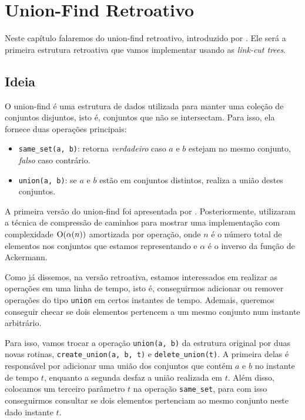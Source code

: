 
\chapter{Union-Find Retroativo}
\label{cap:union-find}

Neste capítulo falaremos do union-find retroativo, introduzido por \citet{10.1145/1240233.1240236}. Ele será a primeira estrutura retroativa que vamos implementar usando as \emph{link-cut trees}.

\section{Ideia}
\label{sec:uf-ideia}

O union-find é uma estrutura de dados utilizada para manter uma coleção de conjuntos disjuntos, isto é, conjuntos que não se intersectam. Para isso, ela fornece duas operações principais:

\begin{itemize}
    \item \texttt{same\_set(a, b)}: retorna \emph{verdadeiro} caso $a$ e $b$ estejam no mesmo conjunto, \emph{falso} caso contrário.
    \item \texttt{union(a, b)}: se $a$ e $b$ estão em conjuntos distintos, realiza a união destes conjuntos.
\end{itemize}

A primeira versão do union-find foi apresentada por \citet{10.1145/364099.364331}. Posteriormente, \citet{10.1145/62.2160} utilizaram a técnica de compressão de caminhos para mostrar uma implementação com complexidade $\mathrm{O}( \alpha (n) )$ amortizada por operação, onde $n$ é o número total de elementos nos conjuntos que estamos representando e $\alpha$ é o inverso da função de Ackermann.

Como já dissemos, na versão retroativa, estamos interessados em realizar as operações em uma linha de tempo, isto é, conseguirmos adicionar ou remover operações do tipo \texttt{union} em certos instantes de tempo. Ademais, queremos conseguir checar se dois elementos pertencem a um mesmo conjunto num instante arbitrário.

Para isso, vamos trocar a operação \texttt{union(a, b)} da estrutura original por duas novas rotinas, \texttt{create\_union(a, b, t)} e \texttt{delete\_union(t)}. A primeira delas é responsável por adicionar uma união dos conjuntos que contém $a$ e $b$ no instante de tempo $t$, enquanto a segunda desfaz a união realizada em $t$. Além disso, colocamos um terceiro parâmetro $t$ na operação \texttt{same\_set}, para com isso conseguirmos consultar se dois elementos pertenciam ao mesmo conjunto neste dado instante $t$.

